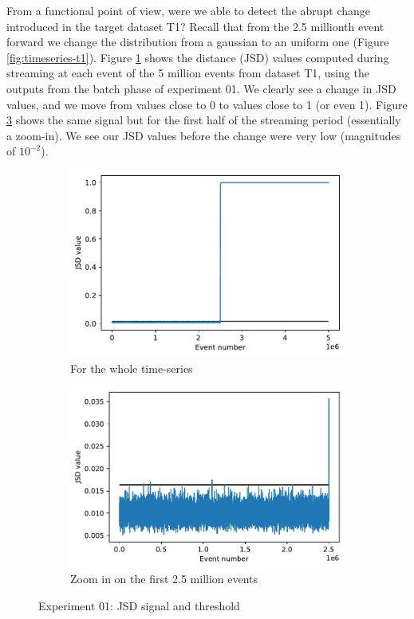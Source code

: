 From a functional point of view, were we able to detect the abrupt change introduced in the target dataset T1? Recall that from the 2.5 millionth event forward we change the distribution from a gaussian to an uniform one (Figure \ref{fig:timeseries-t1}). Figure \ref{fig:JSD-signal-01} shows the distance (JSD) values computed during streaming at each event of the 5 million events from dataset T1, using the outputs from the batch phase of experiment 01. We clearly see a change in JSD values, and we move from values close to 0 to values close to 1 (or even 1). Figure \ref{fig:JSD-signal-zoom-01} shows the same signal but for the first half of the streaming period (essentially a zoom-in). We see our JSD values before the change were very low (magnitudes of $10^{-2}$).
\begin{figure}[!htb]
\centering
\begin{subfigure}{.5\textwidth}
  \centering
  \includegraphics[width=1\linewidth]{figures/stream-analysis-viz-625.pdf}
  \caption{For the whole time-series}
  \label{fig:JSD-signal-01}
\end{subfigure}%
\begin{subfigure}{.5\textwidth}
  \centering
  \includegraphics[width=1\linewidth]{figures/stream-analysis-viz-zoom-625.pdf}
  \caption{Zoom in on the first 2.5 million events}
  \label{fig:JSD-signal-zoom-01}
\end{subfigure}
\caption{Experiment 01: JSD signal and threshold}
\end{figure}

